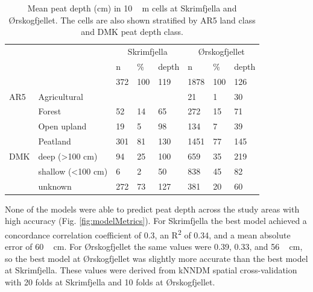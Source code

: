 \documentclass[soil, manuscript]{copernicus}
\begin{document}
\begin{table}[tbp]
\caption{Mean peat depth (cm) in \unit{10\,m} cells at Skrimfjella and Ørskogfjellet. The cells are also shown stratified by AR5 land class and DMK peat depth class.}
\begin{tabular}{llllllll}
\hline
    &                            & \multicolumn{3}{c}{Skrimfjella} & \multicolumn{3}{c}{Ørskogfjellet} \\ \cline{3-8} 
    &                            & n        & \%      & depth      & n          & \%      & depth      \\ \hline
    &                            & 372      & 100     & 119        & 1878       & 100     & 126        \\
AR5 & Agricultural               &          &         &            & 21         & 1       & 30         \\
    & Forest                     & 52       & 14      & 65         & 272        & 15      & 71         \\
    & Open upland                & 19       & 5       & 98         & 134        & 7       & 39         \\
    & Peatland                   & 301      & 81      & 130        & 1451       & 77      & 145        \\
DMK & deep (\textgreater 100 cm) & 94       & 25      & 100        & 659        & 35      & 219        \\
    & shallow (\textless 100 cm) & 6        & 2       & 50         & 838        & 45      & 82         \\
    & unknown                    & 272      & 73      & 127        & 381        & 20      & 60         \\ \hline
\end{tabular}
\label{tab:depthsByClass}
\end{table}

None of the models were able to predict peat depth across the study areas with high accuracy (Fig. \ref{fig:modelMetrics}).
For Skrimfjella the best model achieved a concordance correlation coefficient of 0.3, an R\textsuperscript{2} of 0.34, and a mean absolute error of \unit{60\,cm}.
For Ørskogfjellet the same values were 0.39, 0.33, and \unit{56\,cm}, so the best model at Ørskogfjellet was slightly more accurate than the best model at Skrimfjella.
These values were derived from kNNDM spatial cross-validation with 20 folds at Skrimfjella and 10 folds at Ørskogfjellet.
\end{document}
